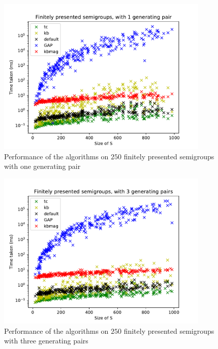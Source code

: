 \begin{figure}[p]
  \centering
  \includegraphics[width=0.9\textwidth]{pics/ch-pairs/bench-fp-1p-times}
  \caption[Benchmark: all algorithms, finitely presented, 1 pair]
  {Performance of the algorithms on $250$ finitely presented semigroups
    with one generating pair}
  \label{fig:bench-fp-1p-times}
\end{figure}

\begin{figure}[p]
  \centering
  \includegraphics[width=0.9\textwidth]{pics/ch-pairs/bench-fp-3p-times}
  \caption[Benchmark: all algorithms, finitely presented, 3 pairs]
  {Performance of the algorithms on $250$ finitely presented semigroups
    with three generating pairs}
  \label{fig:bench-fp-3p-times}
\end{figure}

